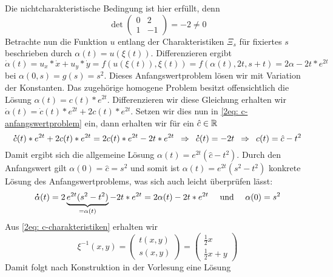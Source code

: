 \begin{exercisePage}[Charakteristikenmethode]
\begin{enumerate}[label=(zu \alph*), leftmargin=*]
		Die nichtcharakteristische Bedingung ist hier erfüllt, denn
		\begin{equation*}
			\det \begin{pmatrix}
				0 & 2 \\ 1 & -1
			\end{pmatrix}
			= -2 \neq 0
		\end{equation*}
		Betrachte nun die Funktion $u$ entlang der Charakteristiken $\Xi_s$ für fixiertes $s$ beschrieben durch $\alpha(t) = u(\xi(t))$. Differenzieren ergibt
		\begin{equation} \label{2eq: c-anfangswertproblem}
			\dot{\alpha}(t) = u_x * \dot{x} + u_y * \dot{y} = f(u(\xi(t)), \xi(t)) = f(\alpha(t), 2t, s+t) = 2\alpha - 2t*e^{2t}
		\end{equation} 
		bei $\alpha(0,s) = g(s) = s^2$. Dieses Anfangswertproblem lösen wir mit Variation der Konstanten. Das zugehörige homogene Problem besitzt offensichtlich die Lösung $\alpha(t) = c(t) * e^{2t}$. Differenzieren wir diese Gleichung erhalten wir $\dot{\alpha}(t) = \dot{c}(t) * e^{2t} + 2c(t) * e^{2t}$. Setzen wir dies nun in \cref{2eq: c-anfangswertproblem} ein, dann erhalten wir für ein $\hat{c} \in \mathbb{R}$
		\begin{equation*}
			\accentset{\mbox{\large\bfseries .}}{c}(t) * e^{2t} + 2c(t) * e^{2t} = 2c(t) * e^{2t} - 2t*e^{2t} \enskip \Rightarrow \enskip \accentset{\mbox{\large\bfseries .}}{c}(t) = -2t \enskip \Rightarrow \enskip c(t) = \hat{c} - t^2
		\end{equation*}
		Damit ergibt sich die allgemeine Lösung $\alpha(t) = e^{2t} (\hat{c} - t^2)$. Durch den Anfangswert gilt $\alpha(0) = \hat{c} = s^2$ und somit ist $\alpha(t) = e^{2t} ( s^2 - t^2)$ konkrete Lösung des Anfangswertproblems, was sich auch leicht überprüfen lässt:
		\begin{equation*}
			\accentset{\mbox{\large\bfseries .}}{\alpha}(t) = 2\underbrace{e^{2t}(s^2 - t^2)}_{= \alpha(t)} - 2t * e^{2t} = 2\alpha(t) - 2t * e^{2t} \quad \text{ und } \quad \alpha(0) = s^2
		\end{equation*}
		Aus \cref{2eq: c-charakteristiken} erhalten wir 
		\begin{equation*}
			\xi^{-1}(x,y) = 
			\begin{pmatrix}
				t(x,y) \\ s(x,y)
			\end{pmatrix}
			=
			\begin{pmatrix}
				\frac{1}{2} x \\ \frac{1}{2} x + y
			\end{pmatrix}
		\end{equation*}
		Damit folgt nach Konstruktion in der Vorlesung eine Lösung
		\begin{equation*}

\end{equation*}
\end{enumerate}
\end{exercisePage}
